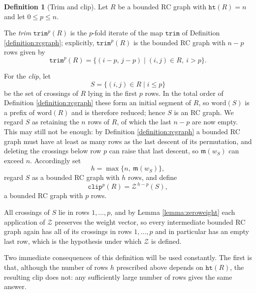 \documentclass{amsart}
\theoremstyle{definition}
\newtheorem{definition}[lemma]{Definition}
\theoremstyle{remark}
\numberwithin{equation}{subsection}
\newcommand{\wof}[1]{w_{#1}}
\newcommand{\trm}{\mathtt{trim}}
\newcommand{\zeromap}{\mathcal{Z}}
\newcommand{\hr}{\mathtt{ht}}
\newcommand{\clp}{\mathtt{clip}}
\newcommand{\maxd}{\mathfrak{m}}
\begin{document}
\begin{definition}[Trim and clip]\label{definition:clptrm}
Let $R$ be a bounded RC graph with $\hr(R)=n$ and let $0\leq p\leq n$.

The \emph{trim} $\trm^p(R)$ is the $p$-fold iterate of the map $\trm$ of Definition \ref{definition:rcgraph}; explicitly, $\trm^p(R)$ is the bounded RC graph with $n-p$ rows given by
$$\trm^p(R)=\{(i-p,\,j-p)\mid (i,j)\in R,\ i>p\}.$$

For the \emph{clip}, let
$$S=\{(i,j)\in R\mid i\leq p\}$$
be the set of crossings of $R$ lying in the first $p$ rows. In the total order of Definition \ref{definition:rcgraph} these form an initial segment of $R$, so $\mathrm{word}(S)$ is a prefix of $\mathrm{word}(R)$ and is therefore reduced; hence $S$ is an RC graph. We regard $S$ as retaining the $n$ rows of $R$, of which the last $n-p$ are now empty. This may still not be enough: by Definition \ref{definition:rcgraph} a bounded RC graph must have at least as many rows as the last descent of its permutation, and deleting the crossings below row $p$ can raise that last descent, so $\maxd(\wof S)$ can exceed $n$. Accordingly set
$$h=\max\{n,\ \maxd(\wof S)\},$$
regard $S$ as a bounded RC graph with $h$ rows, and define
$$\clp^p(R)=\zeromap^{\,h-p}(S),$$
a bounded RC graph with $p$ rows.
\end{definition}

All crossings of $S$ lie in rows $1,\ldots,p$, and by Lemma \ref{lemma:zeroweight} each application of $\zeromap$ preserves the weight vector, so every intermediate bounded RC graph again has all of its crossings in rows $1,\ldots,p$ and in particular has an empty last row, which is the hypothesis under which $\zeromap$ is defined.

Two immediate consequences of this definition will be used constantly. The first is that, although the number of rows $h$ prescribed above depends on $\hr(R)$, the resulting clip does not: any sufficiently large number of rows gives the same answer.
\end{document}
